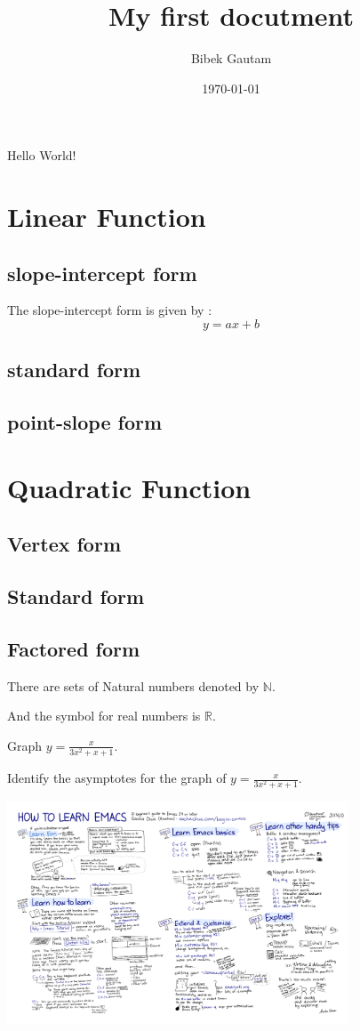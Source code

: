 \documentclass{article}
\title{My first docutment}
\date{\today}
\author{Bibek Gautam}
\def\eq1{y=\frac{x}{3x^2+x+1}}
\begin{document}
\tableofcontents 
        \maketitle

        Hello World!
\section{Linear Function}
   \subsection{slope-intercept form}
   The slope-intercept form is given by : $$y=ax+b$$
   \subsection{standard form}
   \subsection{point-slope form}

\section{Quadratic Function}
   \subsection{Vertex form}
   \subsection{Standard form}
   \subsection{Factored form}

There are sets of Natural numbers denoted by $\mathbb{N}$.

And the symbol for real numbers is $\mathbb{R}$.

Graph $\eq1$.

Identify the asymptotes for the graph of $\eq1$.

\begin{flushleft}\includegraphics[width=4in]{emacsguide.png}\end{flushleft}
\end{document}
